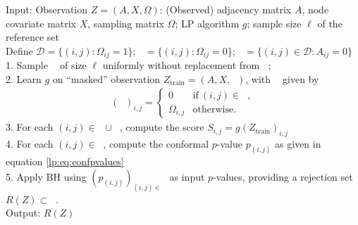 \documentclass[a4paper, 11pt]{article}
\theoremstyle{remark}
\DeclareMathOperator{\Dtr}{\cD_{\text{train}}}
\DeclareMathOperator{\Dcal}{\cD_{\text{cal}}}
\DeclareMathOperator{\Dtest}{\cD_{\text{test}}}
\newcommand{\Ztr}{Z_{\text{train}}}
\DeclareMathOperator{\Otr}{\Omega_{\text{train}}}
\DeclareMathOperator{\cDNull}{\cD^0}
\DeclareMathOperator{\cDAlt}{\cD^1}
\newcommand{\EM}{\ensuremath}
\newcommand{\cD}{\EM{\mathcal{D}}}
\newcommand{\cgreen}[1]{\textcolor{Emerald}{#1}}
\begin{document}
\begin{algorithm}[t]
Input: {Observation $Z=(A,X,\Omega)$: (Observed) adjacency matrix $A$, node covariate matrix $X$, sampling matrix $\Omega$; LP algorithm $g$; 
sample size $\ell$ of the reference set}\\
Define $\cD=\{(i,j) : \Omega_{ij} = 1 \}$; $\Dtest=\{(i,j) : \Omega_{ij} = 0 \}$; $\cDNull = \{ (i,j) \in \cD: A_{ij} =0\}$\\
1. Sample $\Dcal$ of size $\ell$ uniformly without replacement from $\cDNull$; \\
2. Learn $g$ on ``masked'' observation $\Ztr=(A,X,\Otr)$, with $\Otr$ given by  %
\begin{align*}
(\Otr)_{i,j}= \begin{cases}
      0 & \text{if}\ (i,j) \in \Dcal,  \\
      \Omega_{i,j} & \text{otherwise.}
    \end{cases}
\end{align*}
3. For each $(i,j) \in \Dcal \cup \Dtest$, compute the score $S_{i,j} = g(\Ztr)_{i,j}$ \\
4. For each $(i,j) \in \Dtest$, compute the conformal $p$-value $p_{(i,j)}$ as given in equation \eqref{lp:eq:confpvalues} \\
5. Apply BH using $(p_{(i,j)})_{(i,j) \in \Dtest}$ as input $p$-values, 
providing a rejection set $R(Z) \subset \Dtest$. \\
Output: { $R(Z)$} %
  \caption{Conformal link prediction}\label{lp:algo:main}
\end{algorithm}
\end{document}
